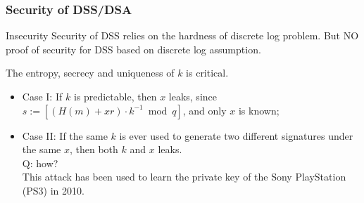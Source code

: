 \begin{frame}\frametitle{Security of DSS/DSA}
\begin{alertblock}{Insecurity}
Security of DSS relies on the hardness of discrete log problem. But NO proof of security for DSS based on discrete log assumption.
\end{alertblock}

\begin{exampleblock}{The entropy, secrecy and uniqueness of $k$ is critical.}
\begin{itemize}
\item Case I: If $k$ is predictable, then $x$ leaks, since $s:= [(H(m)+xr)\cdot k^{-1} \bmod q]$, and only $x$ is known;
\item Case II: If the same $k$ is ever used to generate two different signatures under the same $x$, then both $k$ and $x$ leaks.\\
\alert{Q: how?} \\

This attack has been used to learn the private key of the Sony PlayStation (PS3) in 2010.
\end{itemize}
\end{exampleblock}
\end{frame}

